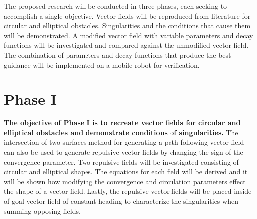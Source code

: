 \documentclass[numbered,pdftex]{ohio-etd}
\begin{document}

The proposed research will be conducted in three phases, each seeking to accomplish a single objective. Vector fields will be reproduced from literature for circular and elliptical obstacles. Singularities and the conditions that cause them will be demonstrated. A modified vector field with variable parameters and decay functions will be investigated and compared against the unmodified vector field. The combination of parameters and decay functions that produce the best guidance will be implemented on a mobile robot for verification. 


\section{Phase I}
\textbf{The objective of Phase I is to recreate vector fields for circular and elliptical obstacles and demonstrate conditions of singularities.} The intersection of two surfaces method for generating a path following vector field can also be used to generate repulsive vector fields by changing the sign of the convergence parameter. Two repulsive fields will be investigated consisting of circular and elliptical shapes. The equations for each field will be derived and it will be shown how modifying the convergence and circulation parameters effect the shape of a vector field. Lastly, the repulsive vector fields will be placed inside of goal vector field of constant heading to characterize the singularities when summing opposing fields. 
\end{document}
